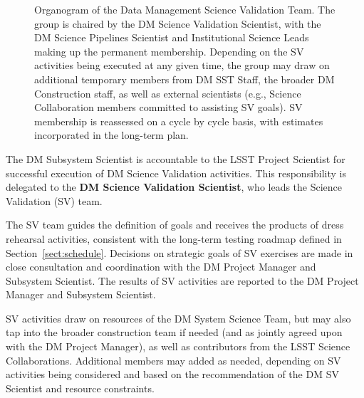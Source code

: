 \begin{figure}
\centering
{}
\caption{Organogram of the Data Management Science Validation Team.
The group is chaired by the DM Science Validation Scientist,
with the DM Science Pipelines Scientist and Institutional Science Leads making up
the permanent membership. Depending on the SV activities being executed at any
given time, the group may draw on additional temporary members from DM SST Staff,
the broader DM Construction staff, as well as external scientists (e.g.,
Science Collaboration members committed to assisting SV goals). SV membership
is reassessed on a cycle by cycle basis, with estimates incorporated in the
long-term plan.
\label{fig:DMsvg}}
\end{figure}

The DM Subsystem Scientist is accountable to the LSST Project Scientist for
successful execution of DM Science Validation activities.  This
responsibility is delegated to the \textbf{DM Science Validation Scientist},
who leads the Science Validation (SV) team.

The SV team guides the definition of goals and receives the products of
dress rehearsal activities, consistent with the long-term testing roadmap
defined in Section~\ref{sect:schedule}.  Decisions on strategic goals of SV exercises are made
in close consultation and coordination with the DM Project Manager and
Subsystem Scientist.  The results of SV activities are reported to the DM
Project Manager and Subsystem Scientist.

SV activities draw on resources of the DM System Science Team, but may also
tap into the broader construction team if needed (and as jointly agreed upon
with the DM Project Manager), as well as contributors from the LSST Science
Collaborations.  Additional members may added as needed, depending on SV
activities being considered and based on the recommendation of the DM SV
Scientist and resource constraints.

